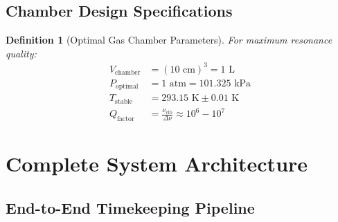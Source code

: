 \documentclass[12pt,a4paper]{article}
\newtheorem{definition}[theorem]{Definition}
\begin{document}
\subsection{Chamber Design Specifications}

\begin{definition}[Optimal Gas Chamber Parameters]
For maximum resonance quality:
\begin{align}
V_{\text{chamber}} &= (10 \text{ cm})^3 = 1 \text{ L} \\
P_{\text{optimal}} &= 1 \text{ atm} = 101.325 \text{ kPa} \\
T_{\text{stable}} &= 293.15 \text{ K} \pm 0.01 \text{ K} \\
Q_{\text{factor}} &= \frac{\nu_{\text{vib}}}{\Delta\nu} \approx 10^6 - 10^7
\end{align}
\end{definition}

\section{Complete System Architecture}

\subsection{End-to-End Timekeeping Pipeline}
\end{document}
